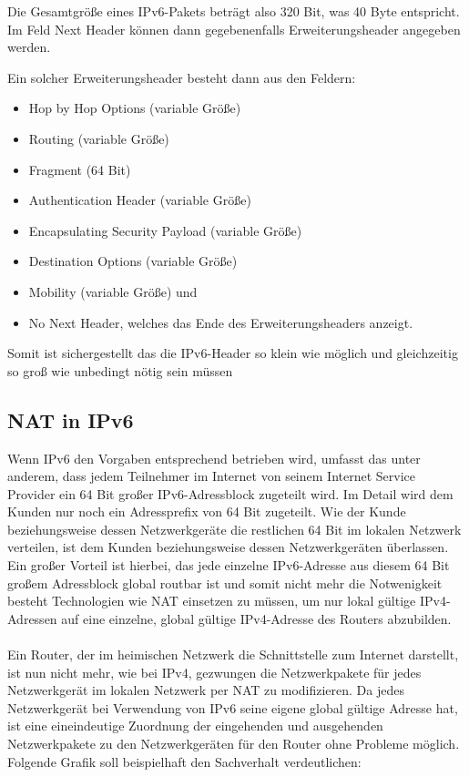 \documentclass[a4paper,12pt]{scrartcl}
\begin{document}
Die Gesamtgr\"o{\ss}e eines IPv6-Pakets betr\"agt also 320 Bit, was 40 Byte entspricht. Im Feld Next Header können dann gegebenenfalls Erweiterungsheader angegeben werden.  

Ein solcher Erweiterungsheader besteht dann aus den Feldern:
\begin{itemize}
 	\item Hop by Hop Options (variable Gr\"o{\ss}e)
	\item  Routing  (variable Gr\"o{\ss}e)
	\item Fragment (64 Bit)
	\item Authentication Header (variable Gr\"o{\ss}e)
	\item Encapsulating Security Payload  (variable Gr\"o{\ss}e)
	\item Destination Options  (variable Gr\"o{\ss}e)
	\item Mobility  (variable Gr\"o{\ss}e) und 
	\item No Next Header, welches das Ende des Erweiterungsheaders anzeigt. 
\end{itemize}

Somit ist sichergestellt das die IPv6-Header so klein wie möglich und gleichzeitig so gro{\ss} wie unbedingt nötig sein müssen  

\subsection{NAT in IPv6}
Wenn IPv6 den Vorgaben entsprechend betrieben wird, umfasst das unter anderem, dass jedem Teilnehmer im Internet von seinem Internet Service Provider ein 64 Bit gro{\ss}er  IPv6-Adressblock zugeteilt wird. Im Detail wird dem Kunden nur noch ein Adressprefix von 64 Bit zugeteilt. Wie der Kunde beziehungsweise dessen Netzwerkger\"ate die restlichen 64 Bit im lokalen Netzwerk verteilen, ist dem Kunden beziehungsweise dessen Netzwerkger\"aten  \"uberlassen. Ein gro{\ss}er Vorteil ist hierbei, das jede einzelne IPv6-Adresse aus diesem 64 Bit gro{\ss}em Adressblock global routbar ist und somit nicht mehr die Notwenigkeit besteht Technologien wie NAT einsetzen zu m\"ussen, um nur lokal g\"ultige IPv4-Adressen auf eine einzelne, global g\"ultige IPv4-Adresse des Routers abzubilden.\\
\\

Ein Router, der im heimischen Netzwerk die Schnittstelle zum Internet darstellt, ist nun nicht mehr, wie bei IPv4, gezwungen die Netzwerkpakete f\"ur jedes Netzwerkger\"at im lokalen Netzwerk per NAT zu modifizieren. Da jedes Netzwerkger\"at bei Verwendung von IPv6 seine eigene global g\"ultige Adresse hat, ist eine eineindeutige Zuordnung der eingehenden und ausgehenden Netzwerkpakete zu den Netzwerkger\"aten f\"ur den Router ohne Probleme m\"oglich.  Folgende Grafik soll beispielhaft den Sachverhalt verdeutlichen:
\end{document}
